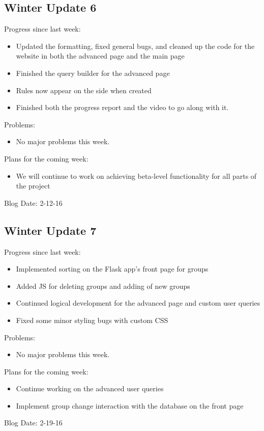 \subsection{Winter Update 6}
Progress since last week:
\begin{itemize}
   \item Updated the formatting, fixed general bugs, and cleaned up the code for the website in both the advanced page and the main page
   \item Finished the query builder for the advanced page
   \item Rules now appear on the side when created
   \item Finished both the progress report and the video to go along with it.
\end{itemize}
Problems:
\begin{itemize}
   \item No major problems this week.
\end{itemize}
Plans for the coming week:
\begin{itemize}
   \item We will continue to work on achieving beta-level functionality for all parts of the project
\end{itemize}
Blog Date: 2-12-16

\subsection{Winter Update 7}
Progress since last week:
\begin{itemize}
   \item Implemented sorting on the Flask app's front page for groups
   \item Added JS for deleting groups and adding of new groups
   \item Continued logical development for the advanced page and custom user queries
   \item Fixed some minor styling bugs with custom CSS
\end{itemize}
Problems:
\begin{itemize}
   \item No major problems this week.
\end{itemize}
Plans for the coming week:
\begin{itemize}
   \item Continue working on the advanced user queries
   \item Implement group change interaction with the database on the front page
\end{itemize}
Blog Date: 2-19-16

